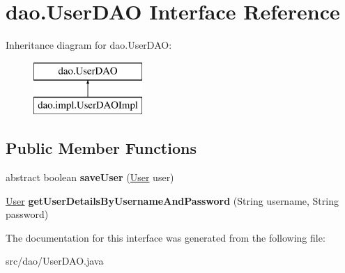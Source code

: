 \hypertarget{interfacedao_1_1_user_d_a_o}{}\section{dao.\+User\+D\+AO Interface Reference}
\label{interfacedao_1_1_user_d_a_o}
Inheritance diagram for dao.\+User\+D\+AO\+:\begin{figure}[H]
\begin{center}
\leavevmode
\includegraphics[height=2.000000cm]{interfacedao_1_1_user_d_a_o}
\end{center}
\end{figure}
\subsection*{Public Member Functions}
\begin{DoxyCompactItemize}
\item 
\mbox{\label{interfacedao_1_1_user_d_a_o_ae21890f6cb21734321a991f1f0c83ed9}} 
abstract boolean {\bfseries save\+User} (\mbox{\hyperlink{classmodel_1_1_user}{User}} user)
\item 
\mbox{\label{interfacedao_1_1_user_d_a_o_a4ff369d895891277cb1a0148039bf406}} 
\mbox{\hyperlink{classmodel_1_1_user}{User}} {\bfseries get\+User\+Details\+By\+Username\+And\+Password} (String username, String password)
\end{DoxyCompactItemize}


The documentation for this interface was generated from the following file\+:\begin{DoxyCompactItemize}
\item 
src/dao/User\+D\+A\+O.\+java\end{DoxyCompactItemize}
